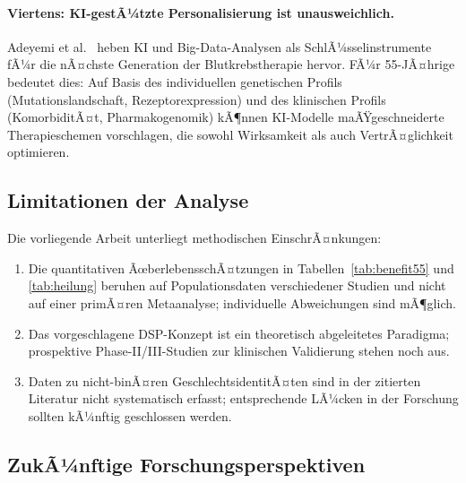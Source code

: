 ﻿\documentclass[12pt,a4paper]{article}
\theoremstyle{definition}
\begin{document}
\paragraph{Viertens: KI-gestÃ¼tzte Personalisierung ist unausweichlich.}
Adeyemi et al.\ \cite{adeyemi2025} heben KI und Big-Data-Analysen als
SchlÃ¼sselinstrumente fÃ¼r die nÃ¤chste Generation der Blutkrebstherapie hervor.
FÃ¼r 55-JÃ¤hrige bedeutet dies: Auf Basis des individuellen genetischen Profils
(Mutationslandschaft, Rezeptorexpression) und des klinischen Profils (KomorbiditÃ¤t,
Pharmakogenomik) kÃ¶nnen KI-Modelle maÃŸgeschneiderte Therapieschemen vorschlagen,
die sowohl Wirksamkeit als auch VertrÃ¤glichkeit optimieren.

\subsection{Limitationen der Analyse}

Die vorliegende Arbeit unterliegt methodischen EinschrÃ¤nkungen:
\begin{enumerate}
  \item Die quantitativen ÃœberlebensschÃ¤tzungen in Tabellen~\ref{tab:benefit55}
        und \ref{tab:heilung} beruhen auf Populationsdaten verschiedener Studien
        und nicht auf einer primÃ¤ren Metaanalyse; individuelle Abweichungen sind
        mÃ¶glich.
  \item Das vorgeschlagene DSP-Konzept ist ein theoretisch abgeleitetes Paradigma;
        prospektive Phase-II/III-Studien zur klinischen Validierung stehen
        noch aus.
  \item Daten zu nicht-binÃ¤ren GeschlechtsidentitÃ¤ten sind in der zitierten
        Literatur nicht systematisch erfasst; entsprechende LÃ¼cken in der
        Forschung sollten kÃ¼nftig geschlossen werden.
\end{enumerate}

\subsection{ZukÃ¼nftige Forschungsperspektiven}
\end{document}
